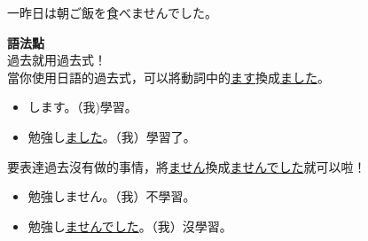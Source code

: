 \begin{itemize}
        一昨日は朝ご飯を食べませんでした。\par
        \textbf{語法點}\\
        過去就用過去式！\\
        當你使用日語的過去式，可以將動詞中的\underline{\textendash ます}換成\underline{\textendash ました}。
        \begin{eg}\leavevmode
            \begin{itemize}
                \item {}します。（我)學習。
                \item 勉強し\underline{ました}。（我）學習了。
            \end{itemize}
        \end{eg}
        要表達過去沒有做的事情，將\underline{\textendash ません}換成\underline{\textendash ませんでした}就可以啦！
        \begin{eg}\leavevmode
            \begin{itemize}
                \item 勉強しません。（我）不學習。
                \item 勉強し\underline{ませんでした}。（我）沒學習。
            \end{itemize}
        \end{eg}
\end{itemize}

